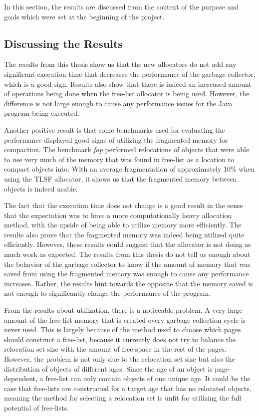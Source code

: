 
In this section, the results are discussed from the context of the purpose and goals which were set at the beginning of the project. 

\subsection{Discussing the Results}
The results from this thesis show us that the new allocators do not add any significant execution time that decreases the performance of the garbage collector, which is a good sign. Results also show that there is indeed an increased amount of operations being done when the free-list allocator is being used. However, the difference is not large enough to cause any performance issues for the Java program being executed. 

Another positive result is that some benchmarks used for evaluating the performance displayed good signs of utilizing the fragmented memory for compaction. The benchmark \textit{fop} performed relocations of objects that were able to use very much of the memory that was found in free-list as a location to compact objects into. With an average fragmentation of approximately 10\% when using the TLSF allocator, it shows us that the fragmented memory between objects is indeed usable. 

The fact that the execution time does not change is a good result in the sense that the expectation was to have a more computationally heavy allocation method, with the upside of being able to utilize memory more efficiently. The results also prove that the fragmented memory was indeed being utilized quite efficiently. However, these results could suggest that the allocator is not doing as much work as expected. The results from this thesis do not tell us enough about the behavior of the garbage collector to know if the amount of memory that was saved from using the fragmented memory was enough to cause any performance increases. Rather, the results hint towards the opposite that the memory saved is not enough to significantly change the performance of the program.

From the results about utilization, there is a noticeable problem. A very large amount of the free-list memory that is created every garbage collection cycle is never used. This is largely because of the method used to choose which pages should construct a free-list, because it currently does not try to balance the relocation set size with the amount of free space in the rest of the pages. However, the problem is not only due to the relocation set size but also the distribution of objects of different ages. Since the age of an object is page-dependent, a free-list can only contain objects of one unique age. It could be the case that free-lists are constructed for a target age that has no relocated objects, meaning the method for selecting a relocation set is unfit for utilizing the full potential of free-lists. 

